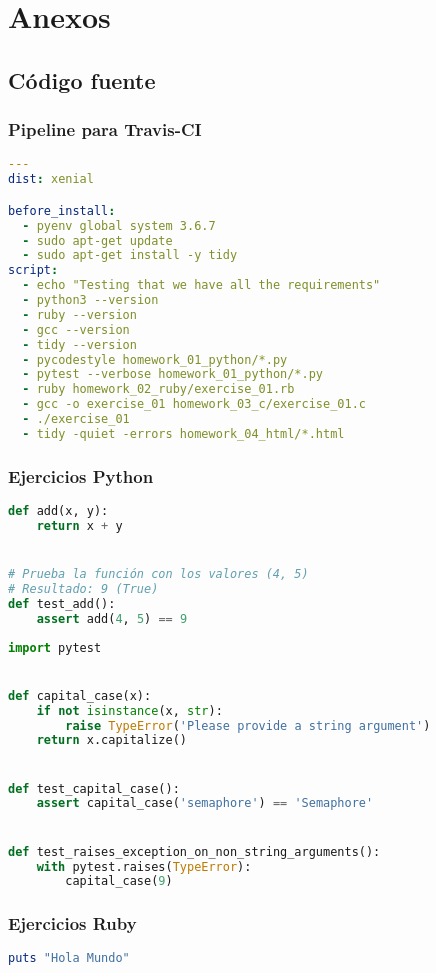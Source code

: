 \chapter{Anexos}

\section{Código fuente}

\subsection{Pipeline para Travis-CI}

\begin{lstlisting}[language=yaml]
---
dist: xenial

before_install:
  - pyenv global system 3.6.7
  - sudo apt-get update
  - sudo apt-get install -y tidy
script:
  - echo "Testing that we have all the requirements"
  - python3 --version
  - ruby --version
  - gcc --version
  - tidy --version
  - pycodestyle homework_01_python/*.py
  - pytest --verbose homework_01_python/*.py
  - ruby homework_02_ruby/exercise_01.rb
  - gcc -o exercise_01 homework_03_c/exercise_01.c
  - ./exercise_01
  - tidy -quiet -errors homework_04_html/*.html
\end{lstlisting}

\subsection{Ejercicios Python}
\begin{lstlisting}[language=python]
def add(x, y):
    return x + y


# Prueba la función con los valores (4, 5)
# Resultado: 9 (True)
def test_add():
    assert add(4, 5) == 9
\end{lstlisting}

\begin{lstlisting}[language=python]
import pytest


def capital_case(x):
    if not isinstance(x, str):
        raise TypeError('Please provide a string argument')
    return x.capitalize()


def test_capital_case():
    assert capital_case('semaphore') == 'Semaphore'


def test_raises_exception_on_non_string_arguments():
    with pytest.raises(TypeError):
        capital_case(9)
\end{lstlisting}

\subsection{Ejercicios Ruby}
\begin{lstlisting}[language=ruby]
puts "Hola Mundo"
\end{lstlisting}

